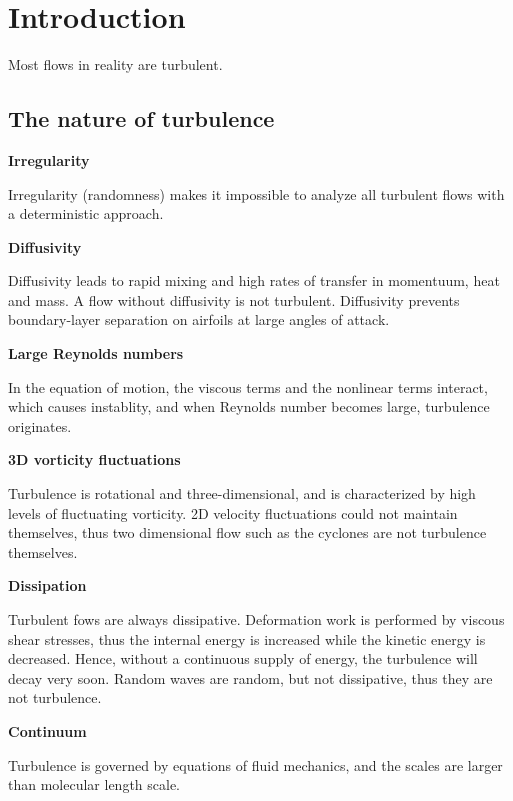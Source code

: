 \documentclass{article}
\begin{document}
\title{}
\author{}
\date{}
\fi

\section{Introduction}

Most flows in reality are turbulent.

\subsection{The nature of turbulence}

\textbf{Irregularity}

Irregularity (randomness) makes it impossible to analyze all turbulent flows with a deterministic approach.

\textbf{Diffusivity}

Diffusivity leads to rapid mixing and high rates of transfer in momentuum, heat and mass. A flow without diffusivity is not turbulent.
Diffusivity prevents boundary-layer separation on airfoils at large angles of attack.

\textbf{Large Reynolds numbers}

In the equation of motion, the viscous terms and the nonlinear terms interact, which causes instablity, and when Reynolds number becomes large, turbulence originates.

\textbf{3D vorticity fluctuations}

Turbulence is rotational and three-dimensional, and is characterized by high levels of fluctuating vorticity. 
2D velocity fluctuations could not maintain themselves, thus two dimensional flow such as the cyclones are not turbulence themselves.

\textbf{Dissipation}

Turbulent fows are always dissipative. Deformation work is performed by viscous shear stresses, thus the internal energy is increased while the kinetic energy is decreased.
Hence, without a continuous supply of energy, the turbulence will decay very soon.
Random waves are random, but not dissipative, thus they are not turbulence.

\textbf{Continuum}

Turbulence is governed by equations of fluid mechanics, and the scales are larger than molecular length scale.
\end{document}
